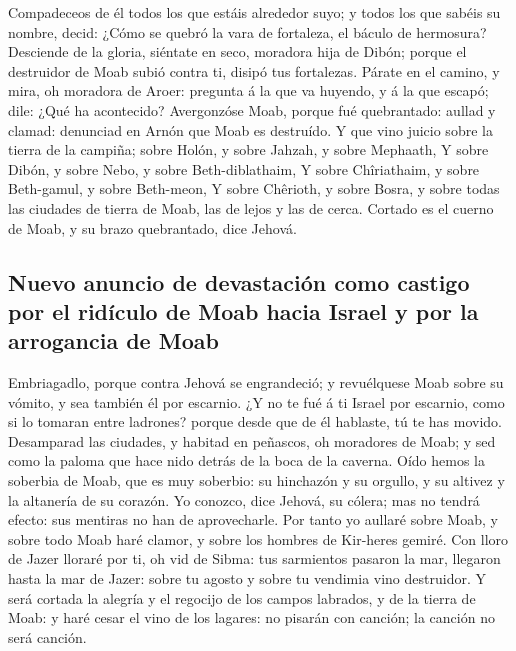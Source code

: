  Compadeceos de él todos los que estáis alrededor suyo; y
todos los que sabéis su nombre, decid: ¿Cómo se quebró la vara de
fortaleza, el báculo de hermosura?  Desciende de la gloria,
siéntate en seco, moradora hija de Dibón; porque el destruidor de Moab
subió contra ti, disipó tus fortalezas.  Párate en el
camino, y mira, oh moradora de Aroer: pregunta á la que va huyendo, y á
la que escapó; dile: ¿Qué ha acontecido?  Avergonzóse Moab,
porque fué quebrantado: aullad y clamad: denunciad en Arnón que Moab es
destruído.  Y que vino juicio sobre la tierra de la
campiña; sobre Holón, y sobre Jahzah, y sobre Mephaath,  Y
sobre Dibón, y sobre Nebo, y sobre Beth-diblathaim,  Y
sobre Chîriathaim, y sobre Beth-gamul, y sobre Beth-meon, 
Y sobre Chêrioth, y sobre Bosra, y sobre todas las ciudades de tierra de
Moab, las de lejos y las de cerca.  Cortado es el cuerno de
Moab, y su brazo quebrantado, dice Jehová.

\hypertarget{nuevo-anuncio-de-devastaciuxf3n-como-castigo-por-el-riduxedculo-de-moab-hacia-israel-y-por-la-arrogancia-de-moab}{%
\subsection{Nuevo anuncio de devastación como castigo por el ridículo de
Moab hacia Israel y por la arrogancia de
Moab}\label{nuevo-anuncio-de-devastaciuxf3n-como-castigo-por-el-riduxedculo-de-moab-hacia-israel-y-por-la-arrogancia-de-moab}}

 Embriagadlo, porque contra Jehová se engrandeció; y
revuélquese Moab sobre su vómito, y sea también él por escarnio.
 ¿Y no te fué á ti Israel por escarnio, como si lo tomaran
entre ladrones? porque desde que de él hablaste, tú te has movido.
 Desamparad las ciudades, y habitad en peñascos, oh
moradores de Moab; y sed como la paloma que hace nido detrás de la boca
de la caverna.  Oído hemos la soberbia de Moab, que es muy
soberbio: su hinchazón y su orgullo, y su altivez y la altanería de su
corazón.  Yo conozco, dice Jehová, su cólera; mas no tendrá
efecto: sus mentiras no han de aprovecharle.  Por tanto yo
aullaré sobre Moab, y sobre todo Moab haré clamor, y sobre los hombres
de Kir-heres gemiré.  Con lloro de Jazer lloraré por ti, oh
vid de Sibma: tus sarmientos pasaron la mar, llegaron hasta la mar de
Jazer: sobre tu agosto y sobre tu vendimia vino destruidor.
 Y será cortada la alegría y el regocijo de los campos
labrados, y de la tierra de Moab: y haré cesar el vino de los lagares:
no pisarán con canción; la canción no será canción.

